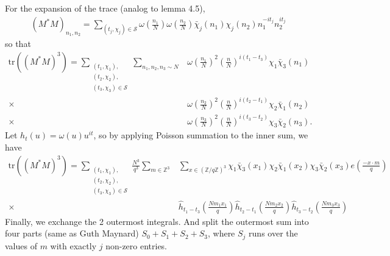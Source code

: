For the expansion of the trace (analog to lemma 4.5), 
\begin{align*}
    (M^*M)_{n_1,n_2} = \sum_{(t_j,\chi_j)\in \mathcal{S}} \omega\left(\frac{n_1}{N}\right)\omega\left(\frac{n_2}{N}\right)
    \bar{\chi}_j(n_1)\chi_j(n_2)n_1^{-it_j}n_2^{it_j}
\end{align*}
so that \begin{align*}
    \textrm{tr}((M^*M)^3)=\sum_{\substack{(t_1,\chi_1),\\(t_2,\chi_2),\\(t_3,\chi_3)\in\mathcal{S}}}\sum_{n_1,n_2,n_3\sim N} & 
    \omega\left(\frac{n_1}{N}\right)^2 \left(\frac{n}{N}\right)^{i(t_1-t_3)}\chi_1\bar{\chi}_3(n_1)\\
    \times \ &\omega\left(\frac{n_2}{N}\right)^2 \left(\frac{n}{N}\right)^{i(t_2-t_1)}\chi_2\bar{\chi}_1(n_2)\\
    \times \ &\omega\left(\frac{n_3}{N}\right)^2 \left(\frac{n}{N}\right)^{i(t_3-t_2)}\chi_3\bar{\chi}_2(n_3).
\end{align*}
Let $h_t(u)=\omega(u)u^{it}$,
so by applying Poisson summation to the inner sum, we have \begin{align*}
    \textrm{tr}((M^*M)^3)=\sum_{\substack{(t_1,\chi_1),\\(t_2,\chi_2),\\(t_3,\chi_3)\in\mathcal{S}}}
    \frac{N^3}{q^3}\sum_{m\in\mathbb{Z}^3}&\sum_{x\in (\mathbb{Z}/q\mathbb{Z})^3}\chi_1\bar{\chi}_3(x_1)\chi_2\bar{\chi}_1(x_2)\chi_3\bar{\chi}_2(x_3) e\left(\frac{-x\cdot m}{q}\right)\\
    \times \ &\hat{h}_{t_1-t_3}\left(\frac{Nm_1x_1}{q}\right)\hat{h}_{t_2-t_1}\left(\frac{Nm_2x_2}{q}\right)\hat{h}_{t_3-t_2}\left(\frac{Nm_3x_3}{q}\right) 
\end{align*}
Finally, we exchange the 2 outermost integrals. And split the outermost sum into four parts (same as Guth Maynard) $S_0+ S_1+S_2+S_3$,
where $S_j$ runs over the values of $m$ with exactly $j$ non-zero entries.
